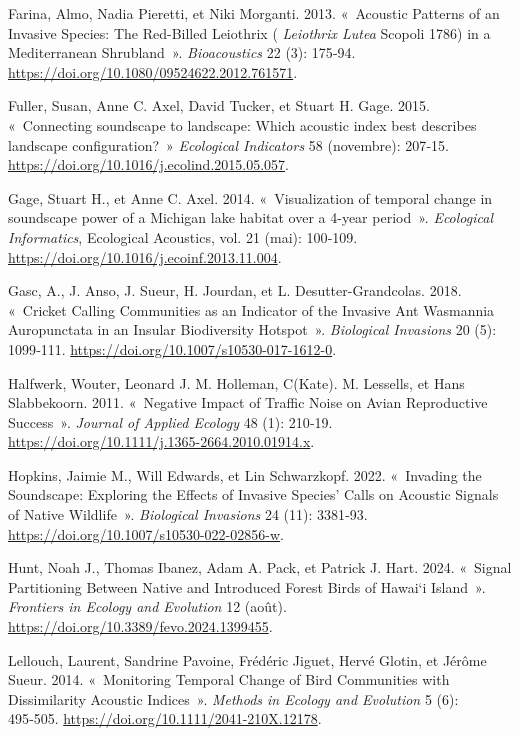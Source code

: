 \documentclass[
  french,
  11pt,
]{stylisharticle}
\newlength{\cslhangindent}
\newenvironment{CSLReferences}[2] %
 {\begin{list}{}{%
  \setlength{\itemindent}{0pt}
  \setlength{\leftmargin}{0pt}
  \setlength{\parsep}{0pt}
  \ifodd #1
   \setlength{\leftmargin}{\cslhangindent}
   \setlength{\itemindent}{-1\cslhangindent}
  \fi
  \setlength{\itemsep}{#2\baselineskip}}}
 {\end{list}}
\begin{document}
\begin{CSLReferences}{1}{1}
Farina, Almo, Nadia Pieretti, et Niki Morganti. 2013. {«~Acoustic
Patterns of an Invasive Species: The Red-Billed Leiothrix (
{\emph{Leiothrix Lutea}} Scopoli 1786) in a Mediterranean Shrubland~»}.
\emph{Bioacoustics} 22 (3): 175‑94.
\url{https://doi.org/10.1080/09524622.2012.761571}.

Fuller, Susan, Anne C. Axel, David Tucker, et Stuart H. Gage. 2015.
{«~Connecting soundscape to landscape: Which acoustic index best
describes landscape configuration?~»} \emph{Ecological Indicators} 58
(novembre): 207‑15. \url{https://doi.org/10.1016/j.ecolind.2015.05.057}.

Gage, Stuart H., et Anne C. Axel. 2014. {«~Visualization of temporal
change in soundscape power of a Michigan lake habitat over a 4-year
period~»}. \emph{Ecological Informatics}, Ecological Acoustics, vol. 21
(mai): 100‑109. \url{https://doi.org/10.1016/j.ecoinf.2013.11.004}.

Gasc, A., J. Anso, J. Sueur, H. Jourdan, et L. Desutter-Grandcolas.
2018. {«~Cricket Calling Communities as an Indicator of the Invasive Ant
Wasmannia Auropunctata in an Insular Biodiversity Hotspot~»}.
\emph{Biological Invasions} 20 (5): 1099‑111.
\url{https://doi.org/10.1007/s10530-017-1612-0}.

Halfwerk, Wouter, Leonard J. M. Holleman, C(Kate). M. Lessells, et Hans
Slabbekoorn. 2011. {«~Negative Impact of Traffic Noise on Avian
Reproductive Success~»}. \emph{Journal of Applied Ecology} 48 (1):
210‑19. \url{https://doi.org/10.1111/j.1365-2664.2010.01914.x}.

Hopkins, Jaimie M., Will Edwards, et Lin Schwarzkopf. 2022. {«~Invading
the Soundscape: Exploring the Effects of Invasive Species{'} Calls on
Acoustic Signals of Native Wildlife~»}. \emph{Biological Invasions} 24
(11): 3381‑93. \url{https://doi.org/10.1007/s10530-022-02856-w}.

Hunt, Noah J., Thomas Ibanez, Adam A. Pack, et Patrick J. Hart. 2024.
{«~Signal Partitioning Between Native and Introduced Forest Birds of
Hawai{`}i Island~»}. \emph{Frontiers in Ecology and Evolution} 12
(août). \url{https://doi.org/10.3389/fevo.2024.1399455}.

Lellouch, Laurent, Sandrine Pavoine, Frédéric Jiguet, Hervé Glotin, et
Jérôme Sueur. 2014. {«~Monitoring Temporal Change of Bird Communities
with Dissimilarity Acoustic Indices~»}. \emph{Methods in Ecology and
Evolution} 5 (6): 495‑505.
\url{https://doi.org/10.1111/2041-210X.12178}.


\end{CSLReferences}
\end{document}
